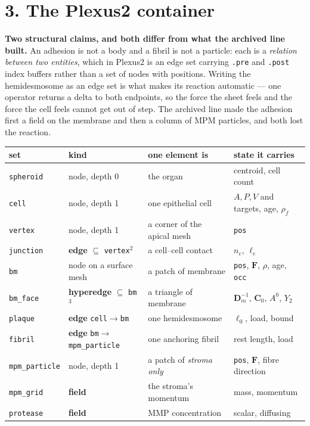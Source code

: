 \documentclass[10pt,a4paper]{article}
\newcommand{\code}[1]{\texttt{#1}}
\begin{document}
\section*{3.\; The Plexus2 container}

\textbf{Two structural claims, and both differ from what the archived line built.} An adhesion is not
a body and a fibril is not a particle: each is a \emph{relation between two entities}, which in
Plexus2 is an edge set carrying \code{.pre} and \code{.post} index buffers rather than a set of nodes
with positions. Writing the hemidesmosome as an edge set is what makes its reaction automatic --- one
operator returns a delta to both endpoints, so the force the sheet feels and the force the cell feels
cannot get out of step. The archived line made the adhesion first a field on the membrane and then a
column of MPM particles, and both lost the reaction.

\begin{center}\small
\begin{tabular}{@{}llll@{}}\toprule
\textbf{set} & \textbf{kind} & \textbf{one element is} & \textbf{state it carries}\\\midrule
\code{spheroid}     & node, depth 0 & the organ & centroid, cell count\\
\quad\code{cell}    & node, depth 1 & one epithelial cell & $A,P,V$ and targets, age, $\rho_f$\\
\quad\code{vertex}  & node, depth 1 & a corner of the apical mesh & \code{pos}\\
\quad\code{junction}& \textbf{edge} $\subseteq$ \code{vertex}$^2$ & a cell--cell contact & $n_e$,
  $\ell_e$\\\midrule
\code{bm}           & node on a surface mesh & a patch of membrane & \code{pos}, $\mathbf F$, $\rho$,
  age, \code{occ}\\
\code{bm\_face}     & \textbf{hyperedge} $\subseteq$ \code{bm}$^3$ & a triangle of membrane &
  $\mathbf D_m^{-1}$, $\mathbf C_0$, $A^0$, $Y_2$\\
\code{plaque}       & \textbf{edge} \code{cell}$\to$\code{bm} & one hemidesmosome & $\ell_0$, load,
  bound\\
\code{fibril}       & \textbf{edge} \code{bm}$\to$\code{mpm\_particle} & one anchoring fibril & rest
  length, load\\\midrule
\code{mpm\_particle}& node, depth 1 & a patch of \emph{stroma only} & \code{pos}, $\mathbf F$, fibre
  direction\\
\code{mpm\_grid}    & \textbf{field} & the stroma's momentum & mass, momentum\\
\code{protease}     & \textbf{field} & MMP concentration & scalar, diffusing\\
\bottomrule\end{tabular}
\end{center}
\end{document}

